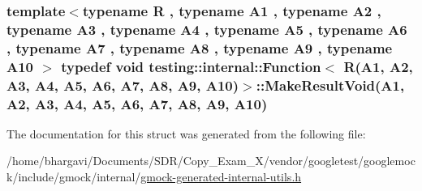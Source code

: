 \subsubsection[{\texorpdfstring{Make\+Result\+Void}{MakeResultVoid}}]{\setlength{\rightskip}{0pt plus 5cm}template$<$typename R , typename A1 , typename A2 , typename A3 , typename A4 , typename A5 , typename A6 , typename A7 , typename A8 , typename A9 , typename A10 $>$ typedef void {\bf testing\+::internal\+::\+Function}$<$ R(A1, A2, A3, A4, A5, A6, A7, A8, A9, A10)$>$\+::Make\+Result\+Void(A1, A2, A3, A4, A5, A6, A7, A8, A9, A10)}\hypertarget{structtesting_1_1internal_1_1_function_3_01_r_07_a1_00_01_a2_00_01_a3_00_01_a4_00_01_a5_00_01_a6f6ff91550f0557b7708e490e5002cd35_aa0f1fef89e59875917d08ba584b05186}{}\label{structtesting_1_1internal_1_1_function_3_01_r_07_a1_00_01_a2_00_01_a3_00_01_a4_00_01_a5_00_01_a6f6ff91550f0557b7708e490e5002cd35_aa0f1fef89e59875917d08ba584b05186}


The documentation for this struct was generated from the following file\+:\begin{DoxyCompactItemize}
\item 
/home/bhargavi/\+Documents/\+S\+D\+R/\+Copy\+\_\+\+Exam\+\_\+X/vendor/googletest/googlemock/include/gmock/internal/\hyperlink{gmock-generated-internal-utils_8h}{gmock-\/generated-\/internal-\/utils.\+h}\end{DoxyCompactItemize}
